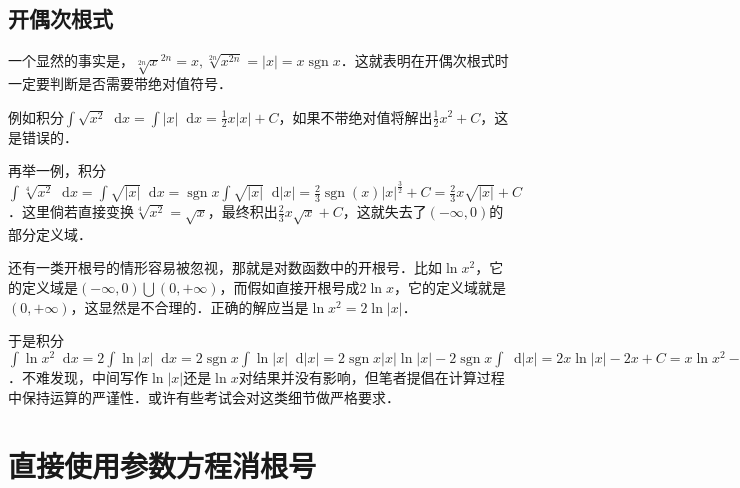 \documentclass{ctexbook}
\DeclareMathOperator{\sgn}{sgn}
\newcommand*{\dif}{\mathop{}\!\mathrm{d}}
\begin{document}
\subsection{开偶次根式}
一个显然的事实是，$\sqrt[2n]{x}^{2n}=x,\sqrt[2n]{x^{2n}}=|x|=x\sgn{x}$．这就表明在开偶次根式时一定要判断是否需要带绝对值符号．\par
例如积分$\int\sqrt{x^{2}}\dif{x}=\int|x|\dif{x}=\frac{1}{2}x|x|+C$，如果不带绝对值将解出$\frac{1}{2}x^{2}+C$，这是错误的．\par
再举一例，积分$\int\sqrt[4]{x^{2}}\dif{x}=\int\sqrt{|x|}\dif{x}=\sgn{x}\int\sqrt{|x|}\dif{|x|}=\frac{2}{3}\sgn{\left(x\right)}|x|^{\frac{3}{2}}+C=\frac{2}{3}x\sqrt{|x|}+C$．这里倘若直接变换$\sqrt[4]{x^{2}}=\sqrt{x}$，最终积出$\frac{2}{3}x\sqrt{x}+C$，这就失去了$\left(-\infty,0\right)$的部分定义域．\par
还有一类开根号的情形容易被忽视，那就是对数函数中的开根号．比如$\ln{x^{2}}$，它的定义域是$\left(-\infty,0\right)\bigcup\left(0,+\infty\right)$，而假如直接开根号成$2\ln{x}$，它的定义域就是$\left(0,+\infty\right)$，这显然是不合理的．正确的解应当是$\ln{x^{2}}=2\ln{|x|}$．\par
于是积分$\int\ln{x^{2}}\dif{x}=2\int\ln{|x|}\dif{x}=2\sgn{x}\int\ln{|x|}\dif{|x|}=2\sgn{x}|x|\ln{|x|}-2\sgn{x}\int\dif{|x|}=2x\ln{|x|}-2x+C=x\ln{x^{2}}-2x+C$．不难发现，中间写作$\ln{|x|}$还是$\ln{x}$对结果并没有影响，但笔者提倡在计算过程中保持运算的严谨性．或许有些考试会对这类细节做严格要求．\par
\section{直接使用参数方程消根号}
\end{document}
